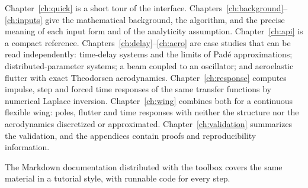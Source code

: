 Chapter~\ref{ch:quick} is a short tour of the interface.
Chapters~\ref{ch:background}--\ref{ch:inputs} give the mathematical
background, the algorithm, and the precise meaning of each input form and
of the analyticity assumption. Chapter~\ref{ch:api} is a compact reference.
Chapters~\ref{ch:delay}--\ref{ch:aero} are case studies that can be read
independently: time-delay systems and the limits of Padé approximations;
distributed-parameter systems; a beam coupled to an oscillator; and
aeroelastic flutter with exact Theodorsen aerodynamics.
Chapter~\ref{ch:response} computes impulse, step and forced time responses
of the same transfer functions by numerical Laplace inversion.
Chapter~\ref{ch:wing} combines both for a continuous flexible wing: poles,
flutter and time responses with neither the structure nor the aerodynamics
discretized or approximated.
Chapter~\ref{ch:validation} summarizes the validation, and the appendices
contain proofs and reproducibility information.

The Markdown documentation distributed with the toolbox covers the same
material in a tutorial style, with runnable code for every step.
